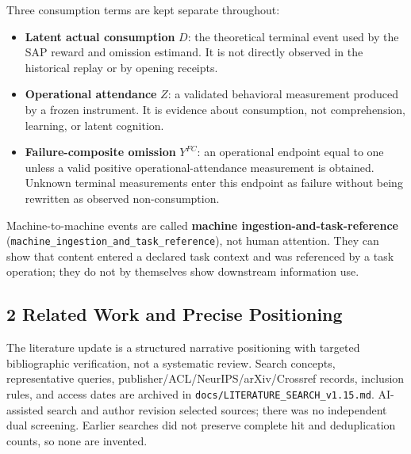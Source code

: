 \documentclass[
  11pt]{article}
\providecommand{\tightlist}{%
  \setlength{\itemsep}{0pt}\setlength{\parskip}{0pt}}
\begin{document}
Three consumption terms are kept separate throughout:

\begin{itemize}
\tightlist
\item
  \textbf{Latent actual consumption} \(D\): the theoretical terminal
  event used by the SAP reward and omission estimand. It is not directly
  observed in the historical replay or by opening receipts.
\item
  \textbf{Operational attendance} \(Z\): a validated behavioral
  measurement produced by a frozen instrument. It is evidence about
  consumption, not comprehension, learning, or latent cognition.
\item
  \textbf{Failure-composite omission} \(Y^{FC}\): an operational
  endpoint equal to one unless a valid positive operational-attendance
  measurement is obtained. Unknown terminal measurements enter this
  endpoint as failure without being rewritten as observed
  non-consumption.
\end{itemize}

Machine-to-machine events are called \textbf{machine
ingestion-and-task-reference}
(\texttt{machine\_ingestion\_and\_task\_reference}), not human
attention. They can show that content entered a declared task context
and was referenced by a task operation; they do not by themselves show
downstream information use.

\subsection{2 Related Work and Precise
Positioning}\label{related-work-and-precise-positioning}

The literature update is a structured narrative positioning with
targeted bibliographic verification, not a systematic review. Search
concepts, representative queries, publisher/ACL/NeurIPS/arXiv/Crossref
records, inclusion rules, and access dates are archived in
\texttt{docs/LITERATURE\_SEARCH\_v1.15.md}. AI-assisted search and
author revision selected sources; there was no independent dual
screening. Earlier searches did not preserve complete hit and
deduplication counts, so none are invented.
\end{document}
